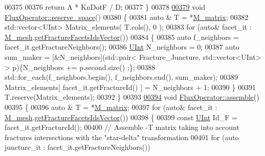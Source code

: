 \begin{DoxyCode}
00375 
00376     \textcolor{keywordflow}{return} A * KnDotF / D;
00377 \}
00378 
\hypertarget{global__operator_8cpp_source.tex_l00379}{}\hyperlink{classFVCode3D_1_1FluxOperator_a9fe4f2f355610d1cbb921382253c3853}{00379} \textcolor{keywordtype}{void} \hyperlink{classFVCode3D_1_1FluxOperator_a9fe4f2f355610d1cbb921382253c3853}{FluxOperator::reserve\_space}()
00380 \{
00381         \textcolor{keyword}{auto} & T = *\hyperlink{classFVCode3D_1_1global__Operator_ab45426efec09f5245e9107794eb7bbd9}{M\_matrix};
00382         std::vector<UInt> Matrix\_elements( T.cols(), 0 );
00383     \textcolor{keywordflow}{for} (\textcolor{keyword}{auto}& facet\_it : \hyperlink{classFVCode3D_1_1global__Operator_a027911d0f801f6f19a3006329ec30a7f}{M\_mesh}.\hyperlink{classFVCode3D_1_1Rigid__Mesh_aadbe6d9ad704122537903396d91238e0}{getFractureFacetsIdsVector}())
00384     \{   
00385                 \textcolor{keyword}{auto} f\_neighbors = facet\_it.getFractureNeighbors();
00386                 \hyperlink{namespaceFVCode3D_a4bf7e328c75d0fd504050d040ebe9eda}{UInt} N\_neighbors = 0;
00387         \textcolor{keyword}{auto} sum\_maker = [&N\_neighbors](std::pair< Fracture\_Juncture, std::vector<UInt> > p)\{N\_neighbors +=
       p.second.size() ;\};
00388         std::for\_each(f\_neighbors.begin(), f\_neighbors.end(), sum\_maker);
00389                 Matrix\_elements[ facet\_it.getFractureId() ] = N\_neighbors + 1;
00390         \}       
00391         T.reserve(Matrix\_elements);
00392 \}
00393 
\hypertarget{global__operator_8cpp_source.tex_l00394}{}\hyperlink{classFVCode3D_1_1FluxOperator_a4f96ac53cafc68eccb01d8ff29eecc87}{00394} \textcolor{keywordtype}{void} \hyperlink{classFVCode3D_1_1FluxOperator_a4f96ac53cafc68eccb01d8ff29eecc87}{FluxOperator::assemble}()
00395 \{
00396         \textcolor{keyword}{auto} & T = *\hyperlink{classFVCode3D_1_1global__Operator_ab45426efec09f5245e9107794eb7bbd9}{M\_matrix};
00397     \textcolor{keywordflow}{for} (\textcolor{keyword}{auto}& facet\_it : \hyperlink{classFVCode3D_1_1global__Operator_a027911d0f801f6f19a3006329ec30a7f}{M\_mesh}.\hyperlink{classFVCode3D_1_1Rigid__Mesh_aadbe6d9ad704122537903396d91238e0}{getFractureFacetsIdsVector}())
00398     \{   
00399                 \textcolor{keyword}{const} \hyperlink{namespaceFVCode3D_a4bf7e328c75d0fd504050d040ebe9eda}{UInt} Id\_F = facet\_it.getFractureId(); 
00400                 \textcolor{comment}{// Assemble -T matrix taking into account fractures intersections with the "star-delta"
       transformation}
00401         \textcolor{keywordflow}{for} (\textcolor{keyword}{auto} juncture\_it : facet\_it.getFractureNeighbors())

\end{DoxyCode}
